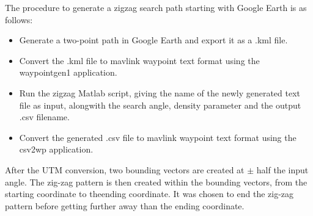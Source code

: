 The procedure to generate a zigzag search path starting with Google Earth is as follows:
\begin{itemize}
\item Generate a two-point path in Google Earth and export it as a .kml file.
\item Convert the .kml file to mavlink waypoint text format using the waypointgen1 application.
\item Run the zigzag Matlab script, giving the name of the newly generated text file as input,
alongwith the search angle, density parameter and the output .csv filename.
\item Convert the generated .csv file to mavlink waypoint text format using the csv2wp application.
\end{itemize}
After the UTM conversion, two bounding vectors are created at \(\pm\) half the input angle.
The zig-zag pattern is then created within the bounding vectors, from the starting coordinate to theending coordinate. It was chosen to end the zig-zag pattern before getting further away than the
ending coordinate.

